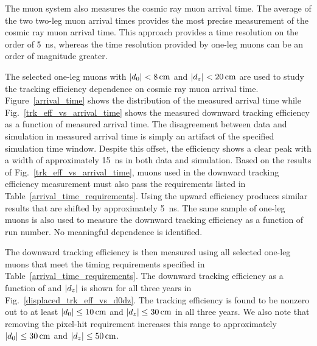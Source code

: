 The muon system also measures the cosmic ray muon arrival time. The average of the two two-leg muon arrival times provides the most precise measurement of the cosmic ray muon arrival time. This approach provides a time resolution on the order of \SI{5}{\ns}, whereas the time resolution provided by one-leg muons can be an order of magnitude greater.

The selected one-leg muons with $\ad<\SI{8}{\cm}$ and $\abs{d_z}<\SI{20}{\cm}$ are used to study the tracking efficiency dependence on cosmic ray muon arrival time. Figure~\ref{arrival_time} shows the distribution of the measured arrival time while Fig.~\ref{trk_eff_vs_arrival_time} shows the measured downward tracking efficiency as a function of measured arrival time. The disagreement between data and simulation in measured arrival time is simply an artifact of the specified simulation time window. Despite this offset, the efficiency shows a clear peak with a width of approximately \SI{15}{\ns} in both data and simulation. Based on the results of Fig.~\ref{trk_eff_vs_arrival_time}, muons used in the downward tracking efficiency measurement must also pass the requirements listed in Table~\ref{arrival_time_requirements}. Using the upward efficiency produces similar results that are shifted by approximately \SI{5}{\ns}. The same sample of one-leg muons is also used to measure the downward tracking efficiency as a function of run number. No meaningful dependence is identified.




The downward tracking efficiency is then measured using all selected one-leg muons that meet the timing requirements specified in Table~\ref{arrival_time_requirements}. The downward tracking efficiency as a function of \ad and $\lvert d_z \rvert$ is shown for all three years in Fig.~\ref{displaced_trk_eff_vs_d0dz}. The tracking efficiency is found to be nonzero out to at least $\ad\leq\SI{10}{\cm}$ and $\abs{d_z}\leq\SI{30}{\cm}$ in all three years. We also note that removing the pixel-hit requirement increases this range to approximately $\ad\leq\SI{30}{\cm}$ and $\abs{d_z}\leq\SI{50}{\cm}$.



